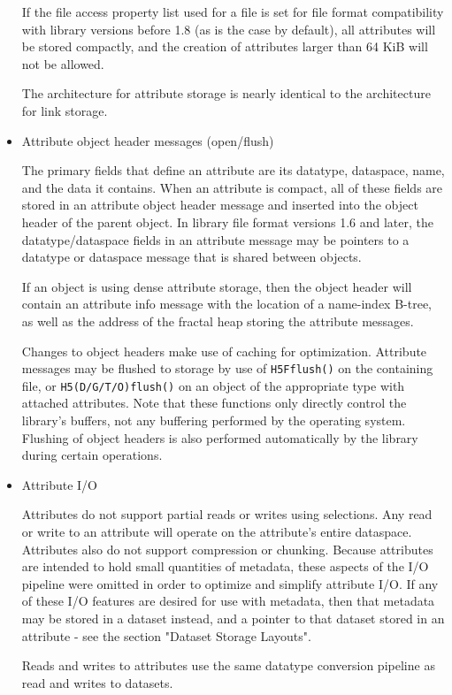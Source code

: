 \begin{itemize}
If the file access property list used for a file is set for file format compatibility with library versions before 1.8 (as is the case by default), all attributes will be stored compactly, and the creation of attributes larger than 64 KiB will not be allowed.

The architecture for attribute storage is nearly identical to the architecture for link storage.

    \item Attribute object header messages (open/flush)

The primary fields that define an attribute are its datatype, dataspace, name, and the data it contains. When an attribute is compact, all of these fields are stored in an attribute object header message and inserted into the object header of the parent object. In library file format versions 1.6 and later, the datatype/dataspace fields in an attribute message may be pointers to a datatype or dataspace message that is shared between objects.

If an object is using dense attribute storage, then the object header will contain an attribute info message with the location of a name-index B-tree, as well as the address of the fractal heap storing the attribute messages.

Changes to object headers make use of caching for optimization. Attribute messages may be flushed to storage by use of \texttt{H5Fflush()} on the containing file, or \texttt{H5(D/G/T/O)flush()} on an object of the appropriate type with attached attributes. Note that these functions only directly control the library's buffers, not any buffering performed by the operating system. Flushing of object headers is also performed automatically by the library during certain operations.

    \item Attribute I/O

Attributes do not support partial reads or writes using selections. Any read or write to an attribute will operate on the attribute's entire dataspace. Attributes also do not support compression or chunking. Because attributes are intended to hold small quantities of metadata, these aspects of the I/O pipeline were omitted in order to optimize and simplify attribute I/O. If any of these I/O features are desired for use with metadata, then that metadata may be stored in a dataset instead, and a pointer to that dataset stored in an attribute - see the section "Dataset Storage Layouts".

Reads and writes to attributes use the same datatype conversion pipeline as read and writes to datasets.


\end{itemize}

